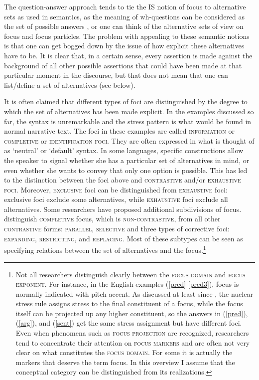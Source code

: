 \documentclass[output=paper,hidelinks]{langscibook}
\begin{document}
The question-answer approach tends to tie the IS notion of focus to alternative sets as used in semantics, as the meaning of wh-questions can be considered as the set of possible answers \citep{Hamblin1973}, or one can think of the alternative sets of  view on focus and focus particles. The problem with appealing to these semantic notions is that one can get bogged down by the issue of how explicit these alternatives have to be. It is clear that, in a certain sense, every assertion is made against the background of all other possible assertions that could have been made at that particular moment in the discourse, but that does not mean that one can list/define a set of alternatives (see below).

It is often claimed that different types of foci are distinguished by the degree to which the set of alternatives has been made explicit. In the examples discussed so far, the syntax is unremarkable and the stress pattern is what would be found in normal narrative text. The foci in these examples are called \textsc{information} or \textsc{completive} or  \textsc{identification foci}. They are often expressed in what is thought of as `neutral' or `default' syntax. In some languages, specific constructions allow the speaker to signal whether she has a particular set of alternatives in mind, or even whether she wants to convey that only one option is possible. This has led to the distinction between the foci above and \textsc{contrastive} and/or \textsc{exhaustive foci}. Moreover,  \textsc{exclusive} foci can be distinguished from \textsc{exhaustive} foci: exclusive foci exclude some alternatives, while \textsc{exhaustive} foci exclude all alternatives. 
Some researchers have proposed additional subdivisions of focus. \citet{Dik1981} distinguish \textsc{completive} focus, which is \textsc{non-contrastive},  from all other \textsc{contrastive} forms: \textsc{parallel, selective} and three types of corrective foci: \textsc{expanding, restricting}, and \textsc{replacing}. Most of these subtypes can be seen as specifying relations between the set of alternatives and the focus.\footnote{Not all researchers distinguish clearly between the \textsc{focus domain} and \textsc{focus exponent}. For instance, in the  English examples (\ref{pred}-\ref{pred3}), focus is normally indicated with pitch accent. As discussed at least since \citet{jackendoff72}, the nuclear stress rule assigns stress to the final constituent of a focus, while the focus itself can be projected up any higher constituent, so the answers in (\ref{pred}), (\ref{arg}), and (\ref{sent}) get the same stress assignment but have different foci. Even when phenomena such as \textsc{focus projection} are recognized, researchers tend to concentrate their attention on \textsc{focus markers} and are often not very clear on what constitutes the \textsc{focus domain}. For some it is actually the markers that deserve the term focus. In this overview I assume that the conceptual category can be distinguished from its realizations.} 
\end{document}
